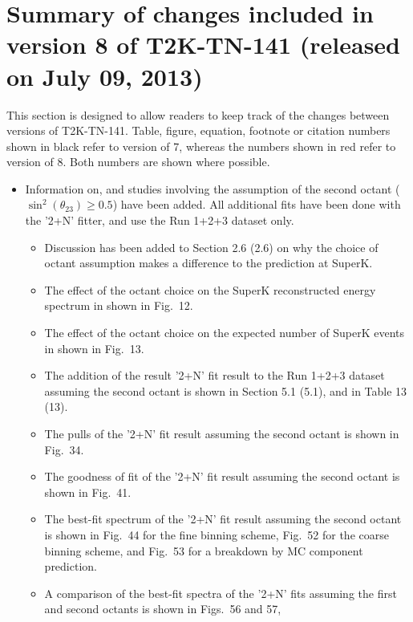 
\section{Summary of changes included in version 8 of T2K-TN-141 (released on July 09, 2013)}

This section is designed to allow readers to keep track of the changes between versions of T2K-TN-141.
Table, figure, equation, footnote or citation numbers shown in black refer to version of 7,
{\color{red}whereas the numbers shown in red refer to version of 8}.
Both numbers are shown where possible.

\begin{itemize}

\item
  Information on, and studies involving the assumption of the second octant
  ($\sin^2(\theta_{23}) \geq 0.5$) have been added. All additional fits have been done with the
  '2+N' fitter, and use the Run 1+2+3 dataset only.
  \begin{itemize}
  \item Discussion has been added to Section 2.6 {\color{red}(2.6)} on why the
    choice of octant assumption makes a difference to the prediction at SuperK.
  \item The effect of the octant choice on the SuperK reconstructed energy spectrum in shown in Fig.\ {\color{red}12}.
  \item The effect of the octant choice on the expected number of SuperK events in shown in Fig.\ {\color{red}13}.
  \item The addition of the result '2+N' fit result to the Run 1+2+3 dataset assuming the second octant is shown in Section 5.1 {\color{red}(5.1)},
    and in Table 13 {\color{red}(13)}.
  \item The pulls of the '2+N' fit result assuming the second octant is shown in Fig.\ {\color{red}34}.
  \item The goodness of fit of the '2+N' fit result assuming the second octant is shown in Fig.\ {\color{red}41}.
  \item The best-fit spectrum of the '2+N' fit result assuming the second octant is shown in Fig.\ {\color{red}44} for the fine binning scheme,
    Fig.\ {\color{red}52} for the coarse binning scheme, and Fig.\ {\color{red}53} for a breakdown by MC component prediction.
  \item A comparison of the best-fit spectra of the '2+N' fits assuming the first and second octants is shown in Figs.\ {\color{red}56} and {\color{red}57},

\end{itemize}
\end{itemize}
